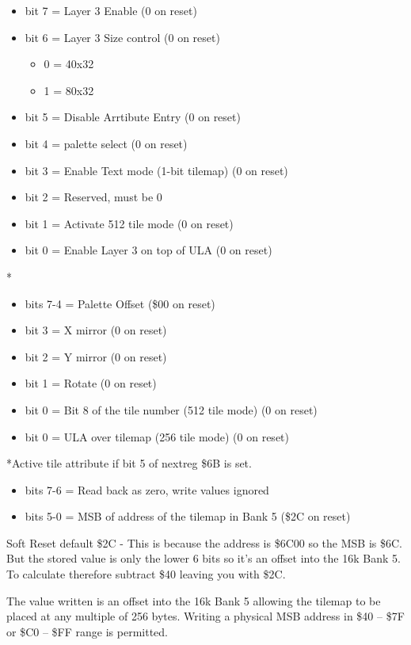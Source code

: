 \begin{itemize}
\item bit 7 = Layer 3 Enable (0 on reset)
\item bit 6 = Layer 3 Size control (0 on reset)
  \begin{itemize}
  \item 0 = 40x32
  \item 1 = 80x32
  \end{itemize}
\item bit 5 = Disable Arrtibute Entry (0 on reset)
\item bit 4 = palette select (0 on reset)
\item bit 3 = Enable Text mode (1-bit tilemap) (0 on reset)
\item bit 2 = Reserved, must be 0
\item bit 1 = Activate 512 tile mode (0 on reset)
\item bit 0 = Enable Layer 3 on top of ULA (0 on reset)
\end{itemize}

*
\begin{itemize}
\item bits 7-4 = Palette Offset (\$00 on reset)
\item bit 3 = X mirror (0 on reset)
\item bit 2 = Y mirror (0 on reset)
\item bit 1 = Rotate (0 on reset)
\item bit 0 = Bit 8 of the tile number (512 tile mode) (0 on reset)
\item bit 0 = ULA over tilemap (256 tile mode) (0 on reset)
\end{itemize}
*Active tile attribute if bit 5 of nextreg \$6B is set.

\begin{itemize}
\item bits 7-6 = Read back as zero, write values ignored
\item bits 5-0 = MSB of address of the tilemap in Bank 5 (\$2C on
  reset)
\end{itemize}
Soft Reset default \$2C - This is because the address is \$6C00 so the
MSB is \$6C. But the stored value is only the lower 6 bits so it's an
offset into the 16k Bank 5. To calculate therefore subtract \$40
leaving you with \$2C.

The value written is an offset into the 16k Bank 5 allowing the
tilemap to be placed at any multiple of 256 bytes.  Writing a physical
MSB address in \$40 -- \$7F or \$C0 -- \$FF range is permitted.

